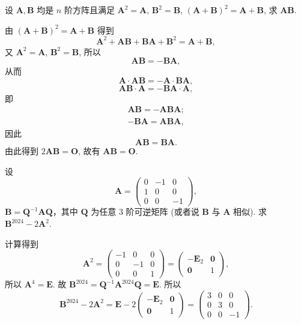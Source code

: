 \documentclass[../../main.tex]{subfiles}
\begin{document}
\begin{example}
设 $\boldsymbol{A},\boldsymbol{B}$ 均是 $n$ 阶方阵且满足 $\boldsymbol{A}^2 = \boldsymbol{A}$, $\boldsymbol{B}^2 = \boldsymbol{B}$, $(\boldsymbol{A} + \boldsymbol{B})^2 = \boldsymbol{A} + \boldsymbol{B}$, 求 $\boldsymbol{AB}$.
\end{example}
\begin{solution}
由 $(\boldsymbol{A} + \boldsymbol{B})^2 = \boldsymbol{A} + \boldsymbol{B}$ 得到
\[
\boldsymbol{A}^2 + \boldsymbol{AB} + \boldsymbol{BA} + \boldsymbol{B}^2 = \boldsymbol{A} + \boldsymbol{B},
\]
又 $\boldsymbol{A}^2 = \boldsymbol{A}$, $\boldsymbol{B}^2 = \boldsymbol{B}$, 所以
\[
\boldsymbol{AB} = -\boldsymbol{BA},
\]
从而
\[
\boldsymbol{A} \cdot \boldsymbol{AB} = -\boldsymbol{A} \cdot \boldsymbol{BA},
\]
\[
\boldsymbol{AB} \cdot \boldsymbol{A} = -\boldsymbol{BA} \cdot \boldsymbol{A},
\]
即
\begin{gather*}
\boldsymbol{AB}=-\boldsymbol{ABA};
\\
-\boldsymbol{BA}=\boldsymbol{ABA},
\end{gather*}
因此
\[
\boldsymbol{AB} = \boldsymbol{BA}.
\]
由此得到 $2\boldsymbol{AB} = \boldsymbol{O}$, 故有 $\boldsymbol{AB} = \boldsymbol{O}$.
\end{solution}

\begin{example}
设
\[
\boldsymbol{A} = \begin{pmatrix} 0 & -1 & 0 \\ 1 & 0 & 0 \\ 0 & 0 & -1 \end{pmatrix},
\]
\(\boldsymbol{B} = \boldsymbol{Q}^{-1}\boldsymbol{A}\boldsymbol{Q}\)，其中 \(\boldsymbol{Q}\) 为任意 3 阶可逆矩阵 (或者说 \(\boldsymbol{B}\) 与 \(\boldsymbol{A}\) 相似). 求 \(\boldsymbol{B}^{2024} - 2\boldsymbol{A}^2\).
\end{example}
\begin{solution}
计算得到
\[
\boldsymbol{A}^2 = \begin{pmatrix} -1 & 0 & 0 \\ 0 & -1 & 0 \\ 0 & 0 & 1 \end{pmatrix} = \begin{pmatrix} -\boldsymbol{E}_2 & \boldsymbol{0} \\ \boldsymbol{0} & 1 \end{pmatrix},
\]
所以 \(\boldsymbol{A}^4 = \boldsymbol{E}\). 故 \(\boldsymbol{B}^{2024} = \boldsymbol{Q}^{-1}\boldsymbol{A}^{2024}\boldsymbol{Q} = \boldsymbol{E}\). 所以
\[
\boldsymbol{B}^{2024} - 2\boldsymbol{A}^2 = \boldsymbol{E} - 2\begin{pmatrix} -\boldsymbol{E}_2 & \boldsymbol{0} \\ \boldsymbol{0} & 1 \end{pmatrix} = \begin{pmatrix} 3 & 0 & 0 \\ 0 & 3 & 0 \\ 0 & 0 & -1 \end{pmatrix}.
\]
\end{solution}
\end{document}
